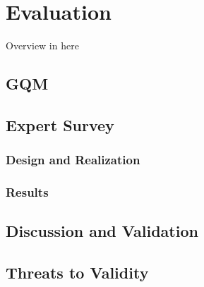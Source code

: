 
\chapter{Evaluation}
\label{chap:ch5}
Overview in here
\section{GQM}
\section{Expert Survey}
\subsection{Design and Realization}
\subsection{Results}
\section{Discussion and Validation}
\section{Threats to Validity}

